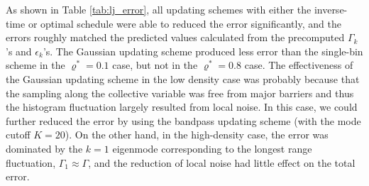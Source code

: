 \documentclass[reprint, superscriptaddress, floatfix]{revtex4-1}
\begin{document}
As shown in Table \ref{tab:lj_error},
all updating schemes
with either the inverse-time or optimal schedule
were able to reduced
the error significantly,
and the errors roughly matched the predicted values
calculated from the precomputed
$\Gamma_k$'s and $\epsilon_k$'s.
%
The Gaussian updating scheme produced less error than
the single-bin scheme in the $\varrho^* = 0.1$ case,
but not in the $\varrho^* = 0.8$ case.
%
The effectiveness of the Gaussian updating scheme
in the low density case
was probably because that the sampling along
the collective variable was free from major barriers
and thus the histogram fluctuation largely
resulted from local noise.
%
In this case, we could further reduced the error
by using the bandpass updating scheme
(with the mode cutoff $K = 20$).
%
On the other hand, in the high-density case,
the error was dominated by the $k=1$ eigenmode
corresponding to the longest range fluctuation,
$\Gamma_1 \approx \Gamma$,
and the reduction of local noise
had little effect on the total error.
\end{document}
